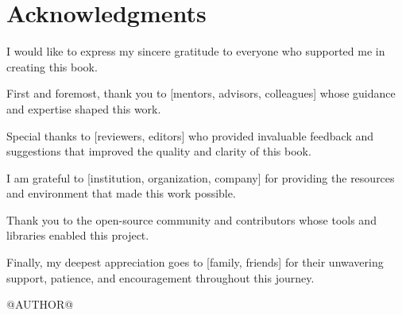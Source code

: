 \chapter*{Acknowledgments}

I would like to express my sincere gratitude to everyone who supported me in creating this book.

First and foremost, thank you to [mentors, advisors, colleagues] whose guidance and expertise shaped this work.

Special thanks to [reviewers, editors] who provided invaluable feedback and suggestions that improved the quality and clarity of this book.

I am grateful to [institution, organization, company] for providing the resources and environment that made this work possible.

Thank you to the open-source community and contributors whose tools and libraries enabled this project.

Finally, my deepest appreciation goes to [family, friends] for their unwavering support, patience, and encouragement throughout this journey.

\vspace{2em}

\begin{flushright}
@AUTHOR@
\end{flushright}

\clearpage
